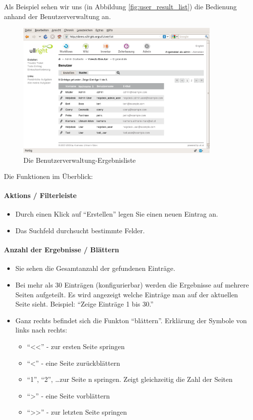 \documentclass[article, a4paper, oneside, 11pt]{memoir}
\begin{document}
Als Beispiel sehen wir uns (in Abbildung \vref{fig:user_result_list}) die Bedienung anhand der Benutzerverwaltung an.

\begin{figure}[htp]
\centering
\includegraphics[width=0.9\textwidth]{figures/ullrightgermanexport-img9.png}
\caption{Die Benutzerverwaltung-Ergebnisliste}
\label{fig:user_result_list}
\end{figure}
Die Funktionen im Überblick:

\paragraph{Aktions / Filterleiste}
\begin{itemize}
\item Durch einen Klick auf "`Erstellen"' legen Sie einen neuen Eintrag an.
\item Das Suchfeld durchsucht bestimmte Felder.
\end{itemize}
\paragraph{Anzahl der Ergebnisse / Blättern}
\begin{itemize}
\item Sie sehen die Gesamtanzahl der gefundenen Einträge.
\item Bei mehr als 30 Einträgen (konfigurierbar) werden die Ergebnisse auf mehrere Seiten aufgeteilt. Es wird angezeigt welche Einträge man auf der aktuellen Seite sieht. Beispiel: "`Zeige Einträge 1 bis 30."'
\item Ganz rechts befindet sich die Funkton "`blättern"'. Erklärung der Symbole von links nach rechts:

\begin{itemize}
\item "`{\textless}{\textless}"' - zur ersten Seite springen
\item "`{\textless}"' - eine Seite zurückblättern
\item "`1"', "`2"', \ldots zur Seite n springen. Zeigt gleichzeitig die Zahl der Seiten
\item "`{\textgreater}"' - eine Seite vorblättern
\item "`{\textgreater}{\textgreater}"' - zur letzten Seite springen
\end{itemize}
\end{itemize}
\end{document}
